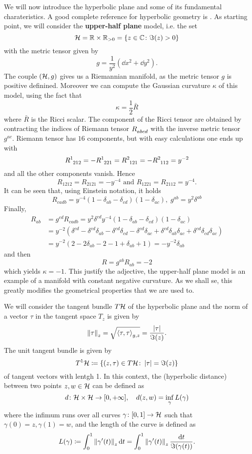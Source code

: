 We will now introduce the hyperbolic plane and some of its fundamental charateristics. A good complete reference for hyperbolic geometry is \cite{Katok:groups}. As starting point, we will consider the \textbf{upper-half plane} model, i.e. the set 
\[
\mathcal{H} = \mathbb{R}\times \mathbb{R}_{>0} = \left\{z\in\mathbb{C}\colon \Im(z)>0\right\}
\]
with the metric tensor given by 
\[
g=\frac{1}{y^{2}}(\dd x^{2}+\dd y^{2}).
\]
The couple $(\mathcal{H},g)$ gives us a Riemannian manifold, as the metric tensor $g$ is positive definined. Moreover we can compute the Gaussian curvature $\kappa$ of this model, using the fact that 
\[
\kappa=\frac{1}{2}\bar{R}
\]
where $\bar{R}$ is the Ricci scalar. The component of the Ricci tensor are obtained by contracting the indices of Riemann tensor $R\indices{_{abcd}}$ with the inverse metric tensor $g^{ac}$. Riemann tensor has $16$ components, but with easy calculations one ends up with 
\[
R\indices{^{1}_{212}}=-R\indices{^{1}_{221}}=R\indices{^{2}_{121}}=-R\indices{^{2}_{112}}=y^{-2}
\]
and all the other components vanish. Hence 
\[
R_{1212}=R_{2121}=-y^{-4}\text{ and }R_{1221}=R_{2112}=y^{-4}.
\]
It can be seen that, using Einstein notation, it holds
\[
R_{cadb}=y^{-4}(1-\delta_{ab}-\delta_{cd})(1-\delta_{ac}),\; g^{ab}=y^{2}\delta^{ab}
\]
Finally,
\begin{align*}
R_{ab} &= g^{cd}R_{cadb}=y^{2}\delta^{cd}y^{-4}(1-\delta_{ab}-\delta_{cd})(1-\delta_{ac})\\
& = y^{-2}(\delta^{cd}-\delta^{cd}\delta_{ab}-\delta^{cd}\delta_{cd}-\delta^{cd}\delta_{ac}+\delta^{cd}\delta_{ab}\delta_{ac}+\delta^{cd}\delta_{cd}\delta_{ac}) \\
& = y^{-2}(2-2\delta_{ab}-2-1+\delta_{ab}+1)=-y^{-2}\delta_{ab}
\end{align*}
and then
\[
R=g^{ab}R_{ab}=-2
\]
which yields $\kappa=-1$. This justify the  adjective, the upper-half plane model is an example of a manifold with constant negative curvature. As we shall se, this greatly modifies the geometrical properties that we are used to.

We will consider the tangent bundle $T\mathcal{H}$ of the hyperbolic plane and the norm of a vector $\tau$ in the tangent space $T_{z}$ is given by
\[
\left\lVert \tau\right\rVert_{z}=\sqrt{\left< \tau,\tau\right>_{g,z}}=\frac{\left| \tau\right|}{\Im(z)}.
\]
The unit tangent bundle is given by
\[
T^{1}\mathcal{H}\coloneqq\left\{
(z,\tau)\in T\mathcal{H}\colon \left| \tau\right|=\Im(z)
\right\}
\]
of tangent vectors with lentgh 1. In this context, the (hyperbolic distance) between two points $z,w\in\mathcal{H}$ can be defined as 
\[
d\colon\mathcal{H}\times\mathcal{H}\to[0,+\infty],\quad d(z,w)=\inf_{\gamma} L(\gamma)
\]
where the infimum runs over all curves $\gamma\colon[0,1]\to\mathcal{H}$ such that $\gamma(0)=z,\gamma(1)=w$, and the length of the curve is defined as
\[
L(\gamma)\coloneqq\int_{0}^{1}\left\lVert \gamma'(t)\right\rVert_{z}\mathop{}\!\mathrm{d} t=\int_{0}^{1}\left\lVert \gamma'(t)\right\rVert_{z}\frac{\mathop{}\!\mathrm{d} t}{\Im(\gamma(t))}.
\]

